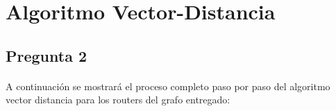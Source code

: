 \documentclass[paper=a4, fontsize=11pt]{scrartcl}
\numberwithin{equation}{section}		%
\numberwithin{figure}{section}			%
\numberwithin{table}{section}				%
\begin{document}
\clearpage

\section*{Algoritmo Vector-Distancia}

\subsection*{Pregunta 2}
\paragraph{} \hspace{0pt}

A continuación se mostrará el proceso completo paso por paso del algoritmo vector distancia para los routers del grafo entregado:\\

\graphicspath{{tablas/}}
\end{document}
